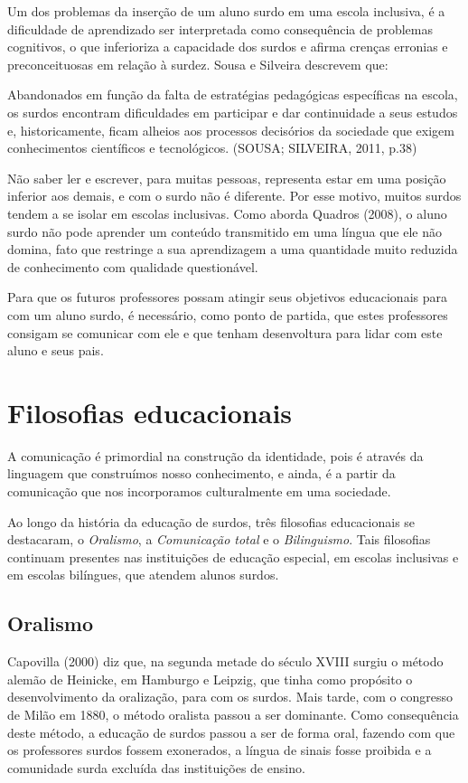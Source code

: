 \documentclass[brasil]{abnt}
\begin{document}
	Um dos problemas da inserção de um aluno surdo em uma escola inclusiva, é a dificuldade de aprendizado ser interpretada como consequência de problemas cognitivos, o que inferioriza
	a capacidade dos surdos e afirma crenças erronias e preconceituosas em relação à surdez. Sousa e Silveira descrevem que:
	
		\begin{citacao} Abandonados em função da falta de estratégias pedagógicas específicas na escola, os surdos encontram dificuldades em participar e dar continuidade a
						seus estudos e, historicamente, ficam alheios aos processos 
						decisórios da sociedade que exigem conhecimentos científicos e 
						tecnológicos. (SOUSA; SILVEIRA, 2011, p.38)
		\end{citacao}
		
	Não saber ler e escrever, para muitas pessoas, representa estar em uma posição inferior aos demais, e com o surdo não é diferente. Por esse motivo, muitos surdos tendem a se isolar em
	escolas inclusivas. Como aborda Quadros (2008), o aluno surdo não pode aprender um conteúdo transmitido em uma língua que ele não domina, fato que restringe a sua aprendizagem a uma 
	quantidade muito reduzida de conhecimento com qualidade questionável. 
	
	Para que os futuros professores possam atingir seus objetivos educacionais para com um aluno surdo, é necessário, como ponto de partida, que estes professores consigam se comunicar com ele e que tenham desenvoltura 
	para lidar com este aluno e seus pais.

\chapter{Filosofias educacionais}
		A comunicação é primordial na construção da identidade, pois é através da linguagem que construímos nosso conhecimento, e ainda, é a partir da comunicação que nos incorporamos culturalmente em uma 
		sociedade. 
		
		Ao longo da história da educação de surdos, três filosofias educacionais se destacaram, o \textit{Oralismo}, a \textit{Comunicação total} e o \textit{Bilinguismo}. Tais filosofias continuam presentes 
		nas instituições de educação especial, em escolas inclusivas e em escolas bilíngues, que atendem alunos surdos.
		
		\section{Oralismo}
		 Capovilla (2000) diz que, na segunda metade do século XVIII surgiu o método alemão de Heinicke, em Hamburgo e Leipzig, que tinha como propósito o desenvolvimento da oralização, para com os surdos. 
		 Mais tarde, com o congresso de Milão em 1880, o método oralista passou a ser dominante. Como consequência deste método, a educação de surdos passou a ser de forma oral, fazendo 
		 com que os professores surdos fossem exonerados, a língua de sinais fosse proibida e a comunidade surda excluída das instituições de ensino. 
		 
\end{document}
